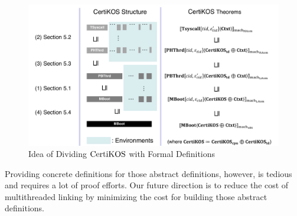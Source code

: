 \begin{figure}
\includegraphics[width=\textwidth, page=3]{figs/certikos/concurrent_linking}
\caption{Idea of Dividing $\mathrm{CertiKOS}$ with Formal Definitions} 
\label{fig:chapter:certikos:multithreaded-connect-proof-overall-structure}
\end{figure}

Providing concrete definitions for those abstract definitions, however, is tedious and requires a lot of proof efforts. 
Our future direction is to reduce the cost of multithreaded linking by minimizing the cost for building 
those abstract definitions. 

%



